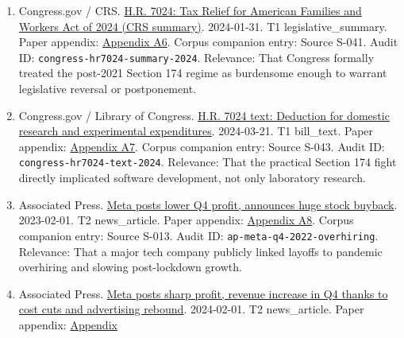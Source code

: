 \documentclass[
  american,
  11pt,
  letterpaper,
]{article}
\begin{document}
\begin{enumerate}
  2024-01-16. T1 legislation. Paper appendix:
  \hyperref[ch-05-appendix-a5-h-r-7024-tax-relief-for-american-families-and-workers-act-of-2024]{Appendix
  A5}. Corpus companion entry: Source S-042. Audit ID:
  \texttt{congress-hr7024-tax-relief-2024}. Relevance: That Congress
  formally moved to soften or reverse the immediate impact of Section
  174 on domestic research expensing.
\item
  Congress.gov / CRS.
  \href{https://www.congress.gov/bill/118th-congress/house-bill/7024}{H.R.
  7024: Tax Relief for American Families and Workers Act of 2024 (CRS
  summary)}. 2024-01-31. T1 legislative\_summary. Paper appendix:
  \hyperref[ch-05-appendix-a6-h-r-7024-tax-relief-for-american-families-and-workers-act-of-2024-crs-summary]{Appendix
  A6}. Corpus companion entry: Source S-041. Audit ID:
  \texttt{congress-hr7024-summary-2024}. Relevance: That Congress
  formally treated the post-2021 Section 174 regime as burdensome enough
  to warrant legislative reversal or postponement.
\item
  Congress.gov / Library of Congress.
  \href{https://www.congress.gov/bill/118th-congress/house-bill/7024/text}{H.R.
  7024 text: Deduction for domestic research and experimental
  expenditures}. 2024-03-21. T1 bill\_text. Paper appendix:
  \hyperref[ch-05-appendix-a7-h-r-7024-text-deduction-for-domestic-research-and-experimental-expenditures]{Appendix
  A7}. Corpus companion entry: Source S-043. Audit ID:
  \texttt{congress-hr7024-text-2024}. Relevance: That the practical
  Section 174 fight directly implicated software development, not only
  laboratory research.
\item
  Associated Press.
  \href{https://apnews.com/article/b884c9ac96be1c22f81d7243176a321d}{Meta
  posts lower Q4 profit, announces huge stock buyback}. 2023-02-01. T2
  news\_article. Paper appendix:
  \hyperref[ch-05-appendix-a8-meta-posts-lower-q4-profit-announces-huge-stock-buyback]{Appendix
  A8}. Corpus companion entry: Source S-013. Audit ID:
  \texttt{ap-meta-q4-2022-overhiring}. Relevance: That a major tech
  company publicly linked layoffs to pandemic overhiring and slowing
  post-lockdown growth.
\item
  Associated Press.
  \href{https://apnews.com/article/abc3e389d97fb97c661ccb6acfcf65c7}{Meta
  posts sharp profit, revenue increase in Q4 thanks to cost cuts and
  advertising rebound}. 2024-02-01. T2 news\_article. Paper appendix:
  \hyperref[ch-05-appendix-a9-meta-posts-sharp-profit-revenue-increase-in-q4-thanks-to-cost-cuts-and-advertising-rebound]{Appendix
}
\end{enumerate}
\end{document}
